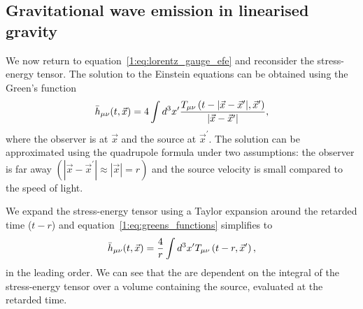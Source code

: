 \subsection{\label{1:sec:gw-emission}Gravitational wave emission in linearised gravity}

We now return to equation~\ref{1:eq:lorentz_gauge_efe} and reconsider the stress-energy tensor. The solution to the Einstein equations can be obtained using the Green's function
%
\begin{equation}
    \Bar{h}_{\mu\nu}(t, \vec{x}) = 4 \int d^3 x^{\prime} \frac{T_{\mu\nu}\left(t - |\vec{x} - \vec{x}^{\prime}|, \vec{x}^{\prime}\right)}{|\vec{x} - \vec{x}^{\prime}|},
    \label{1:eq:greens_functions}
\end{equation}
%
where the observer is at $\vec{x}$ and the source at $\vec{x}^{\prime}$. The solution can be approximated using the quadrupole formula under two assumptions: the observer is far away $\left(|\vec{x} - \vec{x}^{\prime}| \approx |\vec{x}| = r\right)$ and the source velocity is small compared to the speed of light. 

We expand the stress-energy tensor using a Taylor expansion around the retarded time ($t - r$) and equation~\ref{1:eq:greens_functions} simplifies to
%
\begin{equation}
    \Bar{h}_{\mu\nu}(t, \vec{x}) = \frac{4}{r} \int d^3 x^{\prime} T_{\mu\nu}\left(t - r, \vec{x}^{\prime}\right),
    \label{1:eq:quadrupole_simplification}
\end{equation}
%
in the leading order. We can see that the \gws are dependent on the integral of the stress-energy tensor over a volume containing the source, evaluated at the retarded time.

